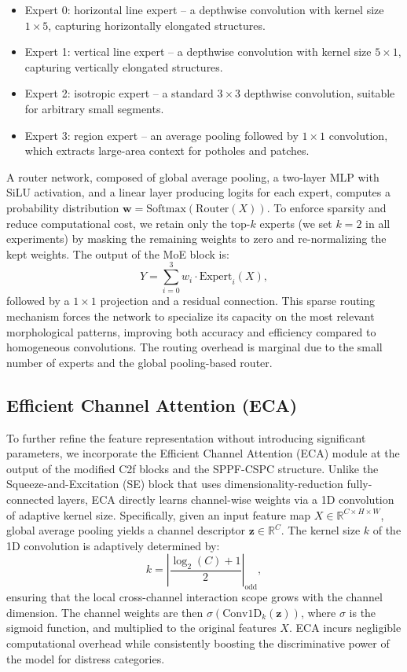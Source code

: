 \documentclass[twocolumn]{sn-jnl}
\begin{document}
	\begin{itemize}
		\item Expert 0: horizontal line expert -- a depthwise convolution with kernel size \(1\times5\), capturing horizontally elongated structures.
		\item Expert 1: vertical line expert -- a depthwise convolution with kernel size \(5\times1\), capturing vertically elongated structures.
		\item Expert 2: isotropic expert -- a standard \(3\times3\) depthwise convolution, suitable for arbitrary small segments.
		\item Expert 3: region expert -- an average pooling followed by \(1\times1\) convolution, which extracts large-area context for potholes and patches.
	\end{itemize}
	
	A router network, composed of global average pooling, a two-layer MLP with SiLU activation, and a linear layer producing logits for each expert, computes a probability distribution \(\mathbf{w} = \text{Softmax}(\text{Router}(X))\). To enforce sparsity and reduce computational cost, we retain only the top-\(k\) experts (we set \(k=2\) in all experiments) by masking the remaining weights to zero and re-normalizing the kept weights. The output of the MoE block is:
	\[
	Y = \sum_{i=0}^{3} w_i \cdot \text{Expert}_i(X),
	\]
	followed by a \(1\times1\) projection and a residual connection. This sparse routing mechanism forces the network to specialize its capacity on the most relevant morphological patterns, improving both accuracy and efficiency compared to homogeneous convolutions. The routing overhead is marginal due to the small number of experts and the global pooling-based router.
	
	\subsection{Efficient Channel Attention (ECA)}
	To further refine the feature representation without introducing significant parameters, we incorporate the Efficient Channel Attention (ECA) module at the output of the modified C2f blocks and the SPPF-CSPC structure. Unlike the Squeeze-and-Excitation (SE) block that uses dimensionality-reduction fully-connected layers, ECA directly learns channel-wise weights via a 1D convolution of adaptive kernel size. Specifically, given an input feature map \(X \in \mathbb{R}^{C \times H \times W}\), global average pooling yields a channel descriptor \(\mathbf{z} \in \mathbb{R}^C\). The kernel size \(k\) of the 1D convolution is adaptively determined by:
	\[
	k = \left| \frac{\log_2(C) + 1}{2} \right|_{\text{odd}},
	\]
	ensuring that the local cross-channel interaction scope grows with the channel dimension. The channel weights are then \(\sigma(\text{Conv1D}_{k}(\mathbf{z}))\), where \(\sigma\) is the sigmoid function, and multiplied to the original features \(X\). ECA incurs negligible computational overhead while consistently boosting the discriminative power of the model for distress categories.
	
\end{document}

